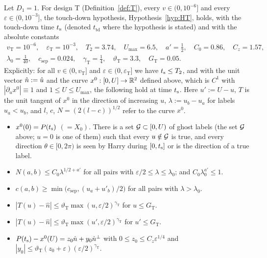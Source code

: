 \begin{theorem}\label{thm:HT}
Let $D_1=1$. For design T (Definition~\ref{def:T}), every $v\in(0,10^{-6}]$ and every $\varepsilon\in(0,10^{-3}]$, the touch-down
hypothesis, Hypothesis~\ref{hyp:HT}, holds, with the touch-down time $t_{\mathrm s}$ (denoted $t_{\mathrm{td}}$ where the hypothesis is
stated) and with the absolute constants
\begin{gather*}
v_{\mathrm T}=10^{-6},\quad\varepsilon_{\mathrm T}=10^{-3},\quad T_2=3.74,\quad U_{\max}=6.5,\quad a'=\tfrac12,\quad C_0=0.86,\quad C_z=1.57,\\
\lambda_0=\tfrac1{40},\quad c_{\mathrm{sep}}=0.024,\quad\gamma_{\mathrm T}=\tfrac14,\quad\vartheta_{\mathrm T}=3.3,\quad G_{\mathrm T}=0.05 .
\end{gather*}
Explicitly: for all $v\in(0,v_{\mathrm T}]$ and $\varepsilon\in(0,\varepsilon_{\mathrm T}]$ we have $t_{\mathrm s}\le T_2$, and with the unit
vector $\hat n:=\hat u$ and the curve $x^0:[0,U]\to\mathbb{R}^2$ defined above, which is $C^1$ with $|\partial_ux^0|\equiv1$ and
$1\le U\le U_{\max}$, the following hold at time $t_{\mathrm s}$. Here $u':=U-u$, $T$ is the unit tangent of $x^0$ in the direction of
increasing $u$, $\lambda:=u_b-u_a$ for labels $u_a<u_b$, and $l$, $c$, $N=(2(l-c))^{1/2}$ refer to the curve $x^0$.
\begin{itemize}
\item[\textup{(T0)}] $x^0(0)=P(t_{\mathrm s})$ $(=X_0)$. There is a set $\mathcal G\subset[0,U)$ of ghost labels (the set $\mathcal G$ above; $u=0$ is one
of them) such that every $u\notin\mathcal G$ is true, and every direction $\theta\in[0,2\pi)$ is seen by Harry during $[0,t_{\mathrm s}]$ or is the
direction of a true label.
\item[\textup{(T1)}] $N(a,b)\le C_0\lambda^{1/2+a'}$ for all pairs with $\varepsilon/2\le\lambda\le\lambda_0$; and
$C_0\lambda_0^{a'}\le1$.
\item[\textup{(T2)}] $c(a,b)\ge\min\bigl(c_{\mathrm{sep}},(u_a+u'_b)/2\bigr)$ for all pairs with $\lambda>\lambda_0$.
\item[\textup{(T3)}] $|T(u)-\hat n|\le\vartheta_{\mathrm T}\max(u,\varepsilon/2)^{\gamma_{\mathrm T}}$ for $u\le G_{\mathrm T}$.
\item[\textup{(T4)}] $|T(u)-\hat n|\le\vartheta_{\mathrm T}\max(u',\varepsilon/2)^{\gamma_{\mathrm T}}$ for $u'\le G_{\mathrm T}$.
\item[\textup{(T5)}] $P(t_{\mathrm s})-x^0(U)=z_0\hat n+y_0\hat n^\perp$ with $0\le z_0\le C_z\varepsilon^{1/4}$ and
$|y_0|\le\vartheta_{\mathrm T}(z_0+\varepsilon)(\varepsilon/2)^{\gamma_{\mathrm T}}$.

\end{itemize}
\end{theorem}
